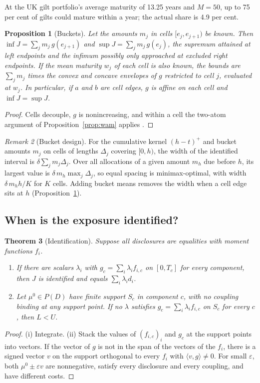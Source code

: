 \documentclass[11pt,a4paper]{article}
\newtheorem{proposition}{Proposition}
\newtheorem{theorem}[proposition]{Theorem}
\theoremstyle{remark}
\newtheorem{remark}[proposition]{Remark}
\begin{document}
At the UK gilt portfolio's average maturity of 13.25 years and $M=50$, up to 75 per cent of gilts could mature within a year; the actual share is 4.9 per cent.

\begin{proposition}[Buckets]\label{prop:buckets}
Let the amounts $m_j$ in cells $[e_j,e_{j+1})$ be known. Then $\inf J=\sum_j m_j\,g(e_{j+1})$ and $\sup J=\sum_j m_j\,g(e_j)$, the supremum attained at left endpoints and the infimum possibly only approached at excluded right endpoints. If the mean maturity $w_j$ of each cell is also known, the bounds are $\sum_j m_j$ times the convex and concave envelopes of $g$ restricted to cell $j$, evaluated at $w_j$. In particular, if $a$ and $b$ are cell edges, $g$ is affine on each cell and $\inf J=\sup J$.
\end{proposition}
\begin{proof}
Cells decouple, $g$ is nonincreasing, and within a cell the two-atom argument of Proposition~\ref{prop:wam} applies \citep{HuangZiembaBenTal1977,BirgeWets1986}.
\end{proof}

\begin{remark}[Bucket design]
For the cumulative kernel $(h-t)^+$ and bucket amounts $m_j$ on cells of lengths $\Delta_j$ covering $[0,h)$, the width of the identified interval is $\delta\sum_j m_j\Delta_j$. Over all allocations of a given amount $m_h$ due before $h$, its largest value is $\delta\,m_h\max_j\Delta_j$, so equal spacing is minimax-optimal, with width $\delta\,m_h h/K$ for $K$ cells. Adding bucket means removes the width when a cell edge sits at $h$ (Proposition~\ref{prop:buckets}).
\end{remark}

\subsection{When is the exposure identified?}

\begin{theorem}[Identification]\label{thm:ident}
Suppose all disclosures are equalities with moment functions $f_i$.
\begin{enumerate}[label=(\roman*)]
\item If there are scalars $\lambda_i$ with $g_c=\sum_i\lambda_i f_{i,c}$ on $[0,T_c]$ for every component, then $J$ is identified and equals $\sum_i\lambda_i d_i$.
\item Let $\mu^0\in P(D)$ have finite support $S_c$ in component $c$, with no coupling binding at any support point. If no $\lambda$ satisfies $g_c=\sum_i\lambda_i f_{i,c}$ on $S_c$ for every $c$, then $L<U$.
\end{enumerate}
\end{theorem}
\begin{proof}
(i) Integrate. (ii) Stack the values of $(f_{i,c})_i$ and $g_c$ at the support points into vectors. If the vector of $g$ is not in the span of the vectors of the $f_i$, there is a signed vector $v$ on the support orthogonal to every $f_i$ with $\langle v,g\rangle\ne0$. For small $\varepsilon$, both $\mu^0\pm\varepsilon v$ are nonnegative, satisfy every disclosure and every coupling, and have different costs.
\end{proof}
\end{document}
